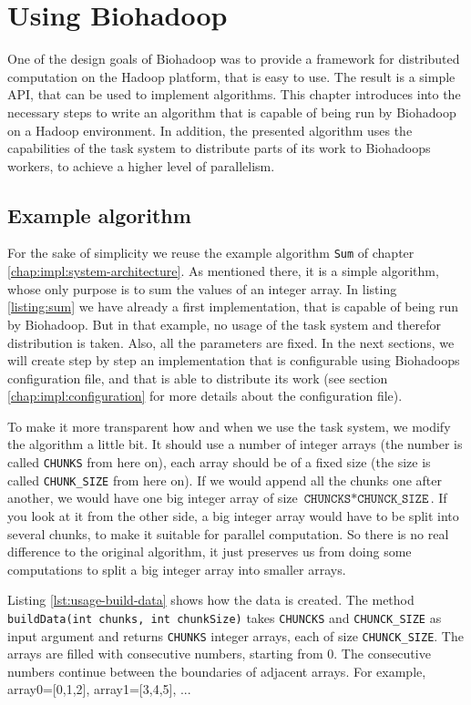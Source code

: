 \chapter{Using Biohadoop}
\label{chap:usage}
One of the design goals of Biohadoop was to provide a framework for distributed computation on the Hadoop platform, that is easy to use. The result is a simple API, that can be used to implement algorithms. This chapter introduces into the necessary steps to write an algorithm that is capable of being run by Biohadoop on a Hadoop environment. In addition, the presented algorithm uses the capabilities of the task system to distribute parts of its work to Biohadoops workers, to achieve a higher level of parallelism.

\section{Example algorithm}
\label{chap:usage:algorithm}
For the sake of simplicity we reuse the example algorithm \texttt{Sum} of chapter \ref{chap:impl:system-architecture}. As mentioned there, it is a simple algorithm, whose only purpose is to sum the values of an integer array. In listing \ref{listing:sum} we have already a first implementation, that is capable of being run by Biohadoop. But in that example, no usage of the task system and therefor distribution is taken. Also, all the parameters are fixed. In the next sections, we will create step by step an implementation that is configurable using Biohadoops configuration file, and that is able to distribute its work (see section \ref{chap:impl:configuration} for more details about the configuration file).

To make it more transparent how and when we use the task system, we modify the algorithm a little bit. It should use a number of integer arrays (the number is called \texttt{CHUNKS} from here on), each array should be of a fixed size (the size is called \texttt{CHUNK\_SIZE} from here on). If we would append all the chunks one after another, we would have one big integer array of size $\texttt{CHUNCKS} * \texttt{CHUNCK\_SIZE}$. If you look at it from the other side, a big integer array would have to be split into several chunks, to make it suitable for parallel computation. So there is no real difference to the original algorithm, it just preserves us from doing some computations to split a big integer array into smaller arrays. 

Listing \ref{lst:usage-build-data} shows how the data is created. The method \texttt{buildData(int chunks, int chunkSize)} takes \texttt{CHUNCKS} and \texttt{CHUNCK\_SIZE} as input argument and returns \texttt{CHUNKS} integer arrays, each of size \texttt{CHUNCK\_SIZE}. The arrays are filled with consecutive numbers, starting from 0. The consecutive numbers continue between the boundaries of adjacent arrays. For example, array0=[0,1,2], array1=[3,4,5], ...

